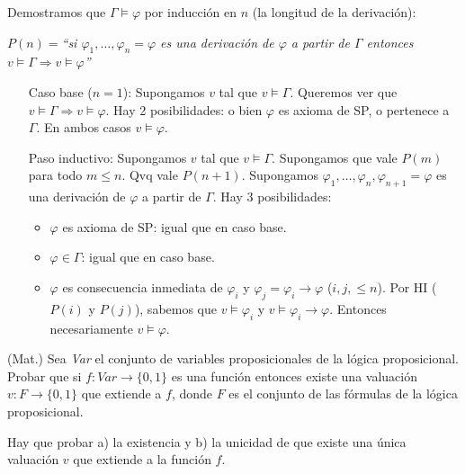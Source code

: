 \begin{questions}
\begin{solution}
 Demostramos que $\Gamma\vDash\varphi$ por inducci\'on en $n$ (la longitud de la derivaci\'on):
 
 \begin{center}
  $P(n)=${\it ``si $\varphi_1, \dots, \varphi_n=\varphi$ es una derivaci\'on de $\varphi$ a partir de $\Gamma$ entonces $v\vDash\Gamma\Rightarrow v\vDash\varphi$''}
 \end{center}

 \begin{enumerate}[\quad]
  \item[Caso base ($n=1$):] Supongamos $v$ tal que $v\vDash\Gamma$. Queremos ver que $v\vDash\Gamma\Rightarrow v\vDash\varphi$. Hay 2 posibilidades: o bien $\varphi$ es axioma de SP, o pertenece a $\Gamma$. En ambos casos $v\vDash\varphi$. 

  \item[Paso inductivo:] Supongamos $v$ tal que $v\vDash\Gamma$. Supongamos que vale $P(m)$ para todo $m\leq n$. Qvq vale $P(n+1)$. Supongamos $\varphi_1, \dots, \varphi_n,\varphi_{n+1}=\varphi$ es una derivaci\'on de $\varphi$ a partir de $\Gamma$. Hay 3 posibilidades: 
  \begin{itemize}
   \item $\varphi$ es axioma de SP: igual que en caso base. 
   \item $\varphi\in\Gamma$: igual que en caso base.
   \item $\varphi$ es consecuencia inmediata de $\varphi_i$ y $\varphi_j=\varphi_i\rightarrow\varphi$ ($i,j,\leq n$). Por HI ($P(i)$ y $P(j)$), sabemos que $v\vDash\varphi_i$ y $v\vDash\varphi_i\rightarrow\varphi$. Entonces necesariamente $v\vDash\varphi$.  
  \end{itemize}

 \end{enumerate}

\end{solution}

\question (Mat.) Sea {\it Var} el conjunto de variables proposicionales de la l\'ogica proposicional. Probar que si $f : Var \rightarrow \{0,1\}$ es una funci\'on entonces existe una valuaci\'on $v: F \rightarrow \{0,1\}$ que extiende a $f$, donde $F$ es el conjunto de las f\'ormulas de la l\'ogica proposicional. 

\begin{solution}
 

Hay que probar a) la existencia y b) la unicidad de que existe una \'unica valuaci\'on $v$ que extiende a la funci\'on $f$. 


\end{solution}
\end{questions}
